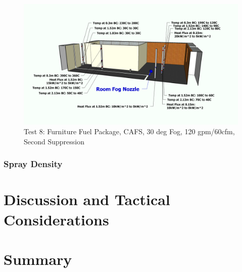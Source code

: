 \documentclass[12pt,oneside]{book}
\begin{document}
\begin{figure}[!ht]
	\includegraphics[width=6in]{../Figures/Pictures/Metric/DelCoFogTest8SecondSuppression}
	\caption{Test 8: Furniture Fuel Package, CAFS, 30 deg Fog, 120 gpm/60cfm, Second Suppression}
	\label{fig:Test_8_Second_Suppression}
\end{figure}

\clearpage

\subsection{Spray Density}
\label{subsec:Spray_Density}
	
\chapter{Discussion and Tactical Considerations}
\label{chap:Discussion_and_Tactical_Considerations}

\chapter{Summary}
\label{chap:Summary}
\end{document}
